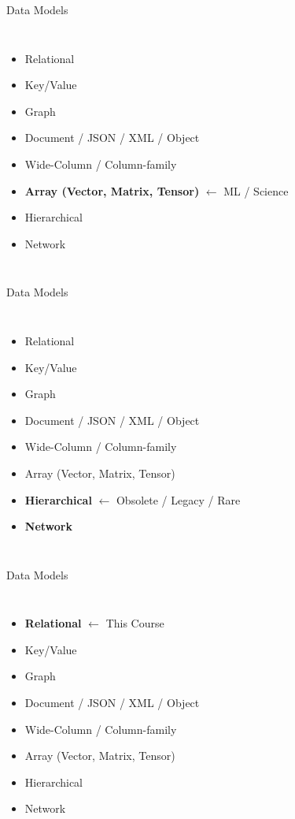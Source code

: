 \documentclass[aspectratio=169, 10pt]{beamer}
\begin{document}
\begin{frame}{Data Models}
    \begin{columns}
        \begin{itemize}
            \item Relational
            \item Key/Value
            \item Graph
            \item Document / JSON / XML / Object
            \item Wide-Column / Column-family
            \item \textbf{Array (Vector, Matrix, Tensor)} $\leftarrow$ ML / Science
            \item Hierarchical
            \item Network
        \end{itemize}
    \end{columns}
\end{frame}

\begin{frame}{Data Models}
    \begin{columns}
        \begin{itemize}
            \item Relational
            \item Key/Value
            \item Graph
            \item Document / JSON / XML / Object
            \item Wide-Column / Column-family
            \item Array (Vector, Matrix, Tensor)
            \item \textbf{Hierarchical} $\leftarrow$ Obsolete / Legacy / Rare
            \item \textbf{Network}
        \end{itemize}
    \end{columns}
\end{frame}

\begin{frame}{Data Models}
    \begin{columns}
        \begin{itemize}
            \item \textbf{Relational} $\leftarrow$ This Course
            \item Key/Value
            \item Graph
            \item Document / JSON / XML / Object
            \item Wide-Column / Column-family
            \item Array (Vector, Matrix, Tensor)
            \item Hierarchical
            \item Network
        \end{itemize}
    \end{columns}
\end{frame}
\end{document}
